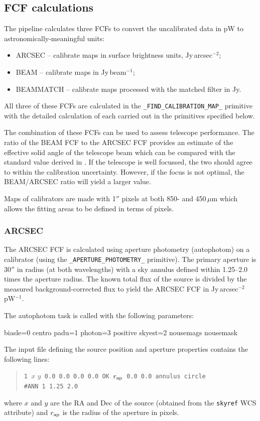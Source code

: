 \documentclass[twoside,11pt,nolof]{starlink}
\providecommand{\task}[1]{\textsf{#1}}
\begin{document}
\subsection{FCF calculations}

The pipeline calculates three FCFs to convert the uncalibrated data in
pW to astronomically-meaningful units:
\begin{itemize}
\item ARCSEC -- calibrate maps in surface brightness units,
  Jy\,arcsec$^{-2}$;
\item BEAM -- calibrate maps in Jy\,beam$^{-1}$;
\item BEAMMATCH -- calibrate maps processed with the matched filter in
  Jy.
\end{itemize}
All three of these FCFs are calculated in the
\verb+_FIND_CALIBRATION_MAP_+ primitive with the detailed calculation
of each carried out in the primitives specified below.

The combination of these FCFs can be used to assess telescope
performance. The ratio of the BEAM FCF to the ARCSEC FCF provides an
estimate of the effective solid angle of the telescope beam which can
be compared with the standard value derived in
\cite{scuba2calpaper}. If the telescope is well focussed, the two
should agree to within the calibration uncertainty. However, if the
focus is not optimal, the BEAM/ARCSEC ratio will yield a larger value.

Maps of calibrators are made with 1$''$ pixels at both 850- and
450\,$\mu$m which allows the fitting areas to be defined in terms of pixels.

\subsubsection{ARCSEC}

The ARCSEC FCF is calculated using aperture photometry
(\task{autophotom}) on a calibrator (using the
\verb+_APERTURE_PHOTOMETRY_+ primitive). The primary aperture is
30$''$ in radius (at both wavelengths) with a sky annulus defined
within 1.25--2.0 times the aperture radius. The known total flux of
the source is divided by the measured background-corrected flux to
yield the ARCSEC FCF in Jy\,arcsec$^{-2}$\,pW$^{-1}$.

The \task{autophotom} task is called with the following parameters:
\begin{terminalv}
biasle=0 centro padu=1 photon=3 positive skyest=2 nousemags nousemask
\end{terminalv}
The input file defining the source position and aperture properties
contains the following lines:
\begin{quote}
\verb+1 +$x$ $y$\verb+ 0.0 0.0 0.0 0.0 OK +$r_{\rm ap}$\verb+ 0.0 0.0 annulus circle+\\
\verb+#ANN 1 1.25 2.0+
\end{quote}
where $x$ and $y$ are the RA and Dec of the source (obtained from the
\verb+skyref+ WCS attribute) and $r_{\rm ap}$ is the radius of the
aperture in pixels.
\end{document}
